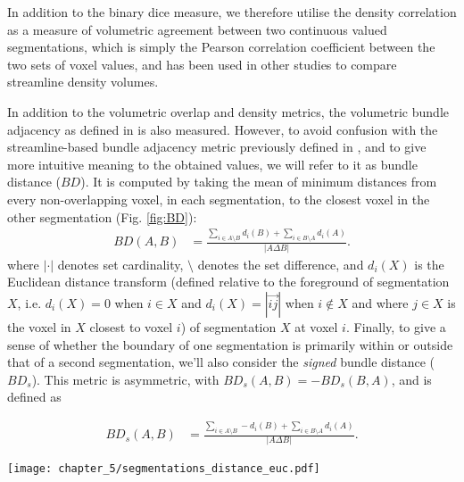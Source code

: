 In addition to the binary \gls{dice} measure, we therefore utilise the density correlation as a measure of volumetric agreement between two continuous valued segmentations, which is simply the Pearson correlation coefficient between the two sets of voxel values, and has been used in other studies to compare streamline density volumes\autocite{Radwan2022, Schilling2021a}.

In addition to the volumetric overlap and density metrics, the volumetric bundle adjacency as defined in \textcite{Schilling2021a} is also measured.
However, to avoid confusion with the streamline-based bundle adjacency\autocite{Radwan2022, Garyfallidis2012, Rheault2022} metric previously defined in \textcite{Garyfallidis2012},
and to give more intuitive meaning to the obtained values, we will refer to it as bundle distance ($BD$).
It is computed by taking the mean of minimum distances from every non-overlapping voxel, in each segmentation, to the closest voxel in the other segmentation (Fig. \ref{fig:BD}):
\begin{align}
  BD(A,B) &= \frac{\sum_{i \in A\setminus B} d_i(B) + \sum_{i \in B\setminus A} d_i(A)}{|A\Delta B|} \label{eq:bd}.
\end{align}
where $| \cdot |$ denotes set cardinality, $\setminus$ denotes the set difference, and $d_i(X)$ is the Euclidean distance transform (defined relative to the foreground of segmentation $X$, i.e. $d_i(X) = 0$ when $i \in X $ and $d_i(X) = |\overrightarrow{ij}|$ when $i \not\in X$ and where $j \in X$ is the voxel in $X$ closest to voxel $i$)  of segmentation $X$ at voxel $i$.
Finally, to give a sense of whether the boundary of one segmentation is primarily within or outside that of a second segmentation, we'll also consider the \textit{signed} bundle distance ($BD_s$).
This metric is asymmetric, with $BD_s (A,B) = -BD_s(B,A)$, and is defined as

\begin{align}
  BD_s(A,B) &= \frac{\sum_{i \in A\setminus B} - d_i(B) + \sum_{i \in B\setminus A} d_i(A)}{|A\Delta B|}. \label{eq:bds}
\end{align}

\begin{SCfigure}[50][htbp!]
  \centering
  \texttt{[image: chapter\_5/segmentations\_distance\_euc.pdf]}
  \caption{Illustration of regions involved in calculating bundle distance metric. The light grey area is $A\setminus B$, dark grey is $B\setminus A$, and in each grey voxel is written its minimum Euclidean distance to the black intersection. Distance sign is negative outside of the reference segmentation ($B$ in this example) and positive inside. To compute the bundle distance $BD(A,B)$ (Eq. \ref{eq:bd}), the mean minimum absolute distance is taken across all 17 voxels in the two grey areas $BD(A,B) = (14+4\sqrt{2}+3\sqrt{5})/17 = 1.55$. To compute the signed bundle distance $BD_s(A,B)$ (Eq. \ref{eq:bds}), the signed distances relative to the reference set $B$ are used: $BD_s(A,B) = (2-2\sqrt{2}-\sqrt{5})/17 = -0.18$. The \gls{dice} for these two segmentations would be $DSC = 2*4/(13+12) = 0.32$}
  \label{fig:BD}
\end{SCfigure}


